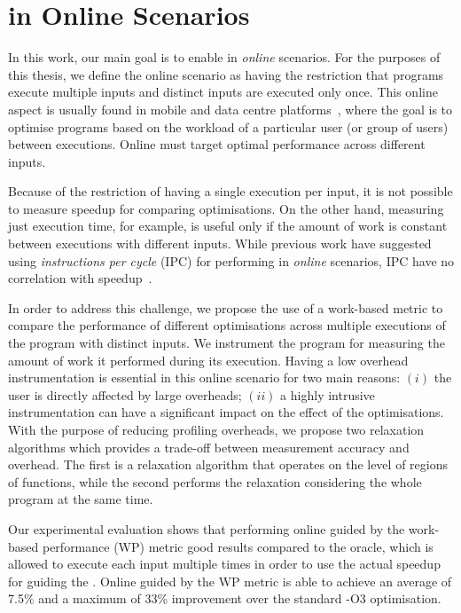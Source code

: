 \section{{\IterComp} in Online Scenarios}

In this work, our main goal is to enable {\itercomp} in \textit{online} scenarios.
For the purposes of this thesis, we define the online scenario as having the restriction that programs execute multiple inputs and distinct inputs are executed only once.
This online aspect is usually found in mobile and data centre platforms~\citep{chen12b,fang15,mpeis16}, where the goal is to optimise programs based on the workload of a particular user (or group of users) between executions.
Online {\itercomp} must target optimal performance across different inputs.

Because of the restriction of having a single execution per input, it is not possible to measure speedup for comparing optimisations.
On the other hand, measuring just execution time, for example, is useful only if the amount of work is constant between executions with different inputs.
While previous work have suggested using \textit{instructions per cycle} (IPC) for performing {\itercomp} in \textit{online} scenarios, IPC have no correlation with speedup~\citep{fursin07}.

In order to address this challenge, we propose the use of a work-based metric to compare the performance of different optimisations across multiple executions of the program with distinct inputs.
We instrument the program for measuring the amount of work it performed during its execution.
Having a low overhead instrumentation is essential in this online scenario for two main reasons:
$(i)$ the user is directly affected by large overheads;
$(ii)$ a highly intrusive instrumentation can have a significant impact on the effect of the optimisations.
With the purpose of reducing profiling overheads, we propose two relaxation algorithms which provides a trade-off between measurement accuracy and overhead.
The first is a relaxation algorithm that operates on the level of regions of functions, while the second performs the relaxation considering the whole program at the same time.

Our experimental evaluation shows that performing online {\itercomp} guided by the work-based performance (WP) metric good results compared to the oracle, which is allowed to execute each input multiple times in order to use the actual speedup for guiding the {\itercomp}.
Online {\itercomp} guided by the WP metric is able to achieve an average of 7.5\% and a maximum of 33\% improvement over the standard {\flagstype -O3} optimisation.

